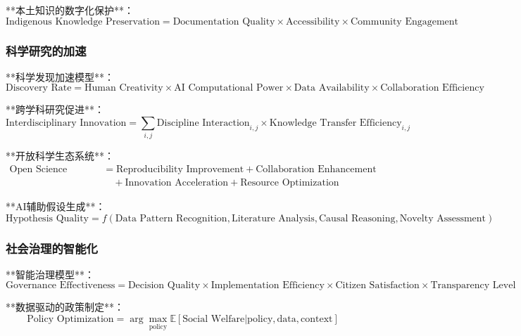 **本土知识的数字化保护**：
\begin{equation}
\text{Indigenous Knowledge Preservation} = \text{Documentation Quality} \times \text{Accessibility} \times \text{Community Engagement}
\end{equation}

\subsubsection{科学研究的加速} %

**科学发现加速模型**：
\begin{equation}
\text{Discovery Rate} = \text{Human Creativity} \times \text{AI Computational Power} \times \text{Data Availability} \times \text{Collaboration Efficiency}
\end{equation}

**跨学科研究促进**：
\begin{equation}
\text{Interdisciplinary Innovation} = \sum_{i,j} \text{Discipline Interaction}_{i,j} \times \text{Knowledge Transfer Efficiency}_{i,j}
\end{equation}

**开放科学生态系统**：
\begin{align}
\text{Open Science Benefits} &= \text{Reproducibility Improvement} + \text{Collaboration Enhancement} \\
&\quad + \text{Innovation Acceleration} + \text{Resource Optimization}
\end{align}

**AI辅助假设生成**：
\begin{equation}
\text{Hypothesis Quality} = f(\text{Data Pattern Recognition}, \text{Literature Analysis}, \text{Causal Reasoning}, \text{Novelty Assessment})
\end{equation}

\subsubsection{社会治理的智能化} %

**智能治理模型**：
\begin{equation}
\text{Governance Effectiveness} = \text{Decision Quality} \times \text{Implementation Efficiency} \times \text{Citizen Satisfaction} \times \text{Transparency Level}
\end{equation}

**数据驱动的政策制定**：
\begin{equation}
\text{Policy Optimization} = \arg\max_{\text{policy}} \mathbb{E}[\text{Social Welfare}|\text{policy}, \text{data}, \text{context}]
\end{equation}

